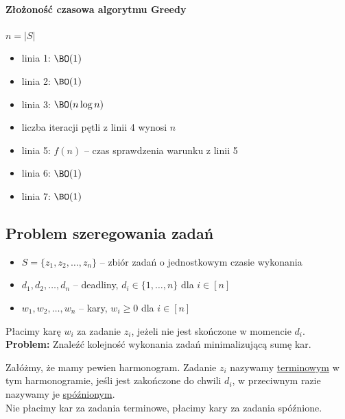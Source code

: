\paragraph{Złożoność czasowa algorytmu Greedy}
$n = |S|$
\begin{itemize}[nosep]
	\item linia 1: $\BO(1)$
	\item linia 2: $\BO(1)$
	\item linia 3: $\BO(n \log n)$
	\item liczba iteracji pętli z linii 4 wynosi $n$
	\item linia 5: $f(n)$ -- czas sprawdzenia warunku z linii 5
	\item linia 6: $\BO(1)$
	\item linia 7: $\BO(1)$
\end{itemize}

\subsection{Problem szeregowania zadań}

\begin{itemize}[nosep]
	\item $S = \{z_1, z_2, \ldots, z_n\}$ -- zbiór zadań o jednostkowym czasie wykonania
	\item $d_1, d_2, \ldots, d_n$ -- deadliny, $d_i \in \{1, \ldots, n\}$ dla $i \in [n]$
	\item $w_1, w_2, \ldots, w_n$ -- kary, $w_i \geq 0$ dla $i \in [n]$
\end{itemize}
Płacimy karę $w_i$ za zadanie $z_i$, jeżeli nie jest skończone w momencie $d_i$.\\
\textbf{Problem:} Znaleźć kolejność wykonania zadań minimalizującą sumę kar.

Załóżmy, że mamy pewien harmonogram. Zadanie $z_i$ nazywamy \underline{terminowym} w tym harmonogramie, jeśli jest zakończone do chwili $d_i$, w przeciwnym razie nazywamy je \underline{spóźnionym}.\\
Nie płacimy kar za zadania terminowe, płacimy kary za zadania spóźnione.

